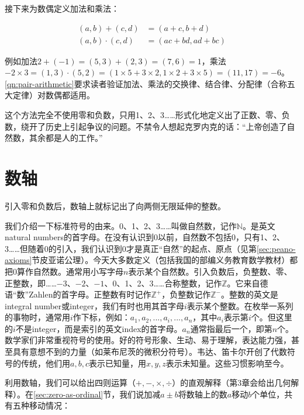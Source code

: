 \documentclass[b5paper]{ctexart}
\begin{document}
接下来为数偶定义加法和乘法：

\begin{align}
(a, b) + (c, d) &= (a + c, b + d) \\
(a, b) \cdot (c, d) &= (ac + bd, ad + bc)
\label{eq:pair-add-mul}
\end{align}

例如加法$2 + (-1) = (5, 3) + (2, 3) = (7, 6) = 1$，乘法$-2 \times 3 = (1, 3) \cdot (5, 2) = (1 \times 5 + 3 \times 2, 1 \times 2 + 3 \times 5) = (11, 17) = -6$。\cref{qn:pair-arithmetic}要求读者验证加法、乘法的交换律、结合律、分配律（合称五大定律）对数偶都适用。

这个方法完全不使用零和负数，只用1、2、3……形式化地定义出了正数、零、负数，绕开了历史上引起争议的问题。不禁令人想起克罗内克的话：“上帝创造了自然数，其余都是人的工作。”

\section{数轴}
引入零和负数后，数轴上就标记出了向两侧无限延伸的整数。

\begin{center}
\end{center}

我们介绍一下标准符号的由来。0、1、2、3……叫做自然数，记作$\mathbb{N}$。是英文natural numbers的首字母。在没有认识到0以前，自然数不包括0，只有1、2、3……但随着0的引入，我们认识到0才是真正“自然”的起点、原点（见第\ref{sec:peano-axioms}节皮亚诺公理）。今天大多数定义（包括我国的部编义务教育数学教材）都把0算作自然数。通常用小写字母$n$表示某个自然数。引入负数后，负整数、零、正整数，即……$-3$、$-2$、$-1$、0、1、2、3……合称整数，记作$\mathbb{Z}$。它来自德语“数”Zahlen的首字母。正整数有时记作$\mathbb{Z}^+$，负整数记作$\mathbb{Z}^-$。整数的英文是integral number或integer，我们有时也用其首字母$i$表示某个整数。在枚举一系列的事物时，通常用$i$作下标，例如：$a_1, a_2, ..., a_i, ..., a_n$，其中$a_i$表示第$i$个。但这里的$i$不是integer，而是索引的英文index的首字母。$a_n$通常指最后一个，即第$n$个。数学家们非常重视符号的使用。好的符号形象、生动、易于理解，表达能力强，甚至具有意想不到的力量（如莱布尼茨的微积分符号）。韦达、笛卡尔开创了代数符号的传统，他们用$a, b, c$表示已知量，用$x, y, z$表示未知量。这些习惯影响至今。

利用数轴，我们可以给出四则运算（$+, -, \times, \div$）的直观解释（第3章会给出几何解释）。在\ref{sec:zero-as-ordinal}节，我们说加减$a \pm b$将数轴上的数$a$移动$b$个单位，共有五种移动情况：
\end{document}
